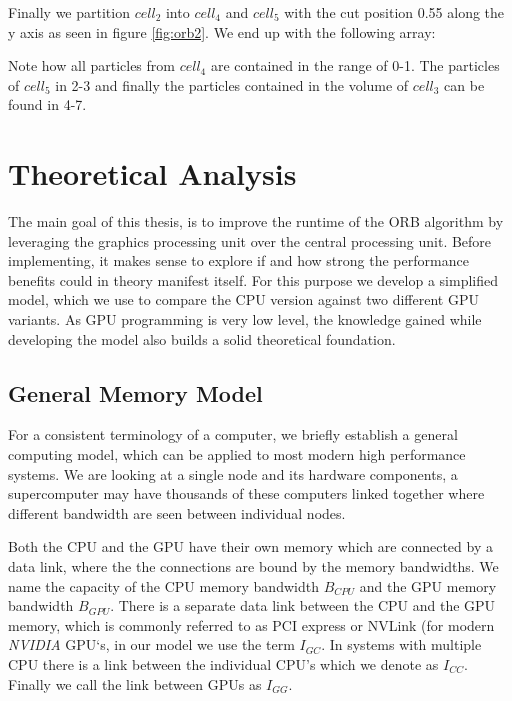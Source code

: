 \documentclass[]{article}
\begin{document}
Finally we partition $cell_2$ into $cell_4$ and $cell_5$ with the cut position 0.55 along the y axis as seen in figure \ref{fig:orb2}. We end up with the following array:

\begin{figure}[H]
	\begin{center}
	\end{center}
\end{figure}

Note how all particles from $cell_4$ are contained in the range of 0-1. The particles of $cell_5$ in 2-3 and finally the particles contained in the volume of $cell_3$ can be found in 4-7.


\newpage
\section{Theoretical Analysis}

The main goal of this thesis, is to improve the runtime of the ORB algorithm by leveraging the graphics processing unit over the central processing unit. Before implementing, it makes sense to explore if and how strong the performance benefits could in theory manifest itself. For this purpose we develop a simplified model, which we use to compare the CPU version against two different GPU variants. As GPU programming is very low level, the knowledge gained while developing the model also builds a solid theoretical foundation.

\subsection{General Memory Model}\label{sec:gmm}

For a consistent terminology of a computer, we briefly establish a general computing model, which can be applied to most modern high performance systems. We are looking at a single node and its hardware components, a supercomputer may have thousands of these computers linked together where different bandwidth are seen between individual nodes.

Both the CPU and the GPU have their own memory which are connected by a data link, where the the connections are bound by the memory bandwidths. We name the capacity of the CPU memory bandwidth $B_{CPU}$ and the GPU memory bandwidth $B_{GPU}$. There is a separate data link between the CPU and the GPU memory, which is commonly referred to as PCI express or NVLink (for modern \textit{NVIDIA} GPU`s, in our model we use the term $I_{GC}$. In systems with multiple CPU there is a link between the individual CPU's which we denote as $I_{CC}$. Finally we call the link between GPUs as $I_{GG}$.
\end{document}
